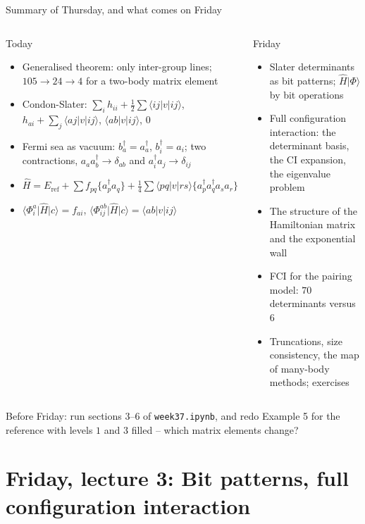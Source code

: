 \documentclass[aspectratio=169,10pt]{beamer}
\newcommand{\ket}[1]{\vert #1\rangle}
\newcommand{\bra}[1]{\langle #1\vert}
\newcommand{\element}[3]{\langle #1\vert #2\vert #3\rangle}
\newcommand{\nc}[1]{\bigl\{#1\bigr\}}
\begin{document}
\begin{frame}{Summary of Thursday, and what comes on Friday}
  \small
  \begin{columns}[T]
    \begin{block}{Today}
      \begin{itemize}
        \item Generalised theorem: only inter-group lines; $105\to24\to4$ for a two-body matrix element
        \item Condon-Slater: $\sum_ih_{ii}+\frac12\sum\element{ij}{v}{ij}$, $h_{ai}+\sum_j\element{aj}{v}{ij}$, $\element{ab}{v}{ij}$, $0$
        \item Fermi sea as vacuum: $b_a^{\dagger}=a_a^{\dagger}$, $b_i^{\dagger}=a_i$; two contractions, $a_aa_b^{\dagger}\to\delta_{ab}$ and $a_i^{\dagger}a_j\to\delta_{ij}$
        \item $\hat{H}=E_{\mathrm{ref}}+\sum f_{pq}\nc{a_p^{\dagger}a_q}+\frac14\sum\element{pq}{v}{rs}\nc{a_p^{\dagger}a_q^{\dagger}a_sa_r}$
        \item $\bra{\Phi_i^a}\hat{H}\ket{c}=f_{ai}$, $\bra{\Phi_{ij}^{ab}}\hat{H}\ket{c}=\element{ab}{v}{ij}$
      \end{itemize}
    \end{block}
    \begin{block}{Friday}
      \begin{itemize}
        \item Slater determinants as bit patterns; $\hat{H}\ket{\Phi}$ by bit operations
        \item Full configuration interaction: the determinant basis, the CI expansion, the eigenvalue problem
        \item The structure of the Hamiltonian matrix and the exponential wall
        \item FCI for the pairing model: $70$ determinants versus $6$
        \item Truncations, size consistency, the map of many-body methods; exercises
      \end{itemize}
    \end{block}
  \end{columns}
  Before Friday: run sections 3--6 of \texttt{week37.ipynb}, and redo Example 5 for the reference with levels $1$ and $3$ filled -- which matrix elements change?
\end{frame}

\section{Friday, lecture 3: Bit patterns, full configuration interaction}
\end{document}
